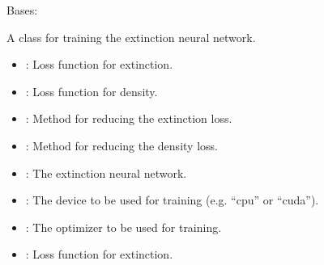 \documentclass[letterpaper,10pt,english]{sphinxmanual}
\begin{document}
\begin{fulllineitems}
\label{\detokenize{NetworkTrainer:NetworkTrainer.NetworkTrainer}}
\pysigstartsignatures
{}
\pysigstopsignatures
\sphinxAtStartPar
Bases: 

\sphinxAtStartPar
A class for training the extinction neural network.
\begin{description}
\begin{itemize}
\item {} 
\sphinxAtStartPar
{}: Loss function for extinction.

\item {} 
\sphinxAtStartPar
{}: Loss function for density.

\item {} 
\sphinxAtStartPar
{}: Method for reducing the extinction loss.

\item {} 
\sphinxAtStartPar
{}: Method for reducing the density loss.

\item {} 
\sphinxAtStartPar
{}: The extinction neural network.

\item {} 
\sphinxAtStartPar
{}: The device to be used for training (e.g. “cpu” or “cuda”).

\item {} 
\sphinxAtStartPar
{}: The optimizer to be used for training.

\end{itemize}

\begin{itemize}
\item {} 
\sphinxAtStartPar
{}: Loss function for extinction.


\end{itemize}
\end{description}
\end{fulllineitems}
\end{document}
